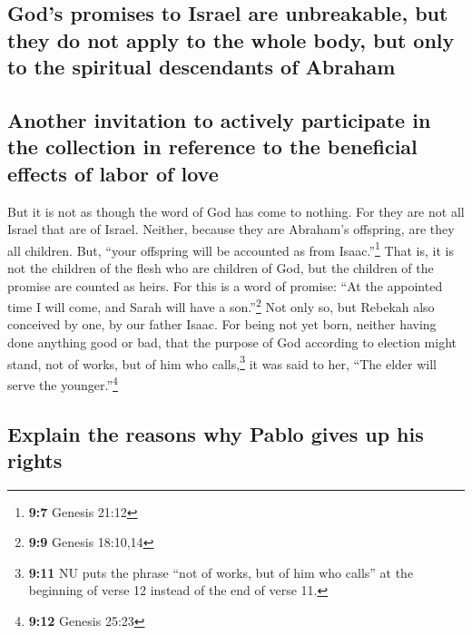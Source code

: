 \hypertarget{gods-promises-to-israel-are-unbreakable-but-they-do-not-apply-to-the-whole-body-but-only-to-the-spiritual-descendants-of-abraham}{%
\subsection{God's promises to Israel are unbreakable, but they do not
apply to the whole body, but only to the spiritual descendants of
Abraham}\label{gods-promises-to-israel-are-unbreakable-but-they-do-not-apply-to-the-whole-body-but-only-to-the-spiritual-descendants-of-abraham}}

\hypertarget{another-invitation-to-actively-participate-in-the-collection-in-reference-to-the-beneficial-effects-of-labor-of-love}{%
\subsection{Another invitation to actively participate in the collection
in reference to the beneficial effects of labor of
love}\label{another-invitation-to-actively-participate-in-the-collection-in-reference-to-the-beneficial-effects-of-labor-of-love}}

 But it is not as though the word of God has come to
nothing. For they are not all Israel that are of Israel. 
Neither, because they are Abraham's offspring, are they all children.
But, ``your offspring will be accounted as from Isaac.''\footnote{\textbf{9:7}
  Genesis 21:12}  That is, it is not the children of the
flesh who are children of God, but the children of the promise are
counted as heirs.  For this is a word of promise: ``At the
appointed time I will come, and Sarah will have a son.''\footnote{\textbf{9:9}
  Genesis 18:10,14}  Not only so, but Rebekah also
conceived by one, by our father Isaac.  For being not yet
born, neither having done anything good or bad, that the purpose of God
according to election might stand, not of works, but of him who
calls,\footnote{\textbf{9:11} NU puts the phrase ``not of works, but of
  him who calls'' at the beginning of verse 12 instead of the end of
  verse 11.}  it was said to her, ``The elder will serve
the younger.''\footnote{\textbf{9:12} Genesis 25:23}

\hypertarget{explain-the-reasons-why-pablo-gives-up-his-rights}{%
\subsection{Explain the reasons why Pablo gives up his
rights}\label{explain-the-reasons-why-pablo-gives-up-his-rights}}

